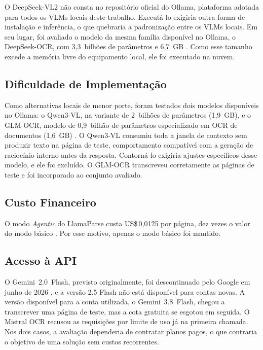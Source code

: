 \documentclass[noabntexcite,oneside]{ufsc-thesis-rn46-2019}
\begin{document}
O DeepSeek-VL2 não consta no repositório oficial do Ollama, plataforma adotada para todos
os VLMs locais deste trabalho. Executá-lo exigiria outra forma de instalação e inferência,
o que quebraria a padronização entre os VLMs locais. Em seu lugar, foi avaliado o modelo da
mesma família disponível no Ollama, o DeepSeek-OCR, com 3,3~bilhões de parâmetros e 6,7~GB
\cite{ollama_deepseekocr}. Como esse tamanho excede a memória livre do equipamento local,
ele foi executado na nuvem.

\subsection{Dificuldade de Implementação}

Como alternativas locais de menor porte, foram testados dois modelos disponíveis no
Ollama: o Qwen3-VL, na variante de 2~bilhões de parâmetros (1,9~GB), e o GLM-OCR, modelo de
0,9~bilhão de parâmetros especializado em OCR de documentos (1,6~GB)
\cite{ollama_glmocr}. O Qwen3-VL consumiu toda a janela de contexto sem produzir texto na
página de teste, comportamento compatível com a geração de raciocínio interno antes da
resposta. Contorná-lo exigiria ajustes específicos desse modelo, e ele foi excluído. O
GLM-OCR transcreveu corretamente as páginas de teste e foi incorporado ao conjunto
avaliado.

\subsection{Custo Financeiro}

O modo \textit{Agentic} do LlamaParse custa US\$\,0,0125 por página, dez vezes o valor do
modo básico \cite{llamaparse_pricing}. Por esse motivo, apenas o modo básico foi
mantido.


\subsection{Acesso à API}

O Gemini~2.0~Flash, previsto originalmente, foi descontinuado pelo Google em junho de 2026
\cite{gemini_pricing}, e a versão 2.5 Flash não está disponível para contas novas. A versão
disponível para a conta utilizada, o Gemini~3.8~Flash, chegou a transcrever uma página de
teste, mas a cota gratuita se esgotou em seguida. O Mistral OCR recusou as requisições por
limite de uso já na primeira chamada. Nos dois casos, a avaliação dependeria de contratar
planos pagos, o que contraria o objetivo de uma solução sem custos recorrentes.
\end{document}
